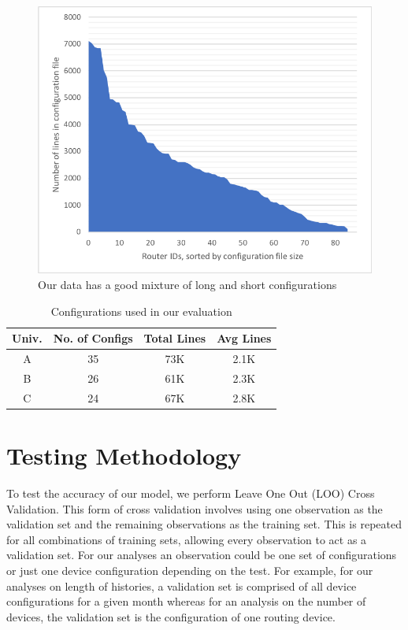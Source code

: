 \documentclass[../thesis.tex]{subfiles}
\begin{document}
\begin{figure}[H]
	\centering
	\includegraphics[width=5in]{config_sizes.png}
	\caption{Our data has a good mixture of long and short configurations}
	\label{fig:configs}
\end{figure}

\begin{table}
    \small \centering
    \begin{tabular}{ | c | c | c | c |}
    \hline
        \textbf{Univ.} & \textbf{No. of Configs} & \textbf{Total Lines} & \textbf{Avg Lines} \\ 
    \hline
    A & 35 & 73K & 2.1K \\ 
    B & 26 & 61K & 2.3K \\ 
    C & 24 & 67K & 2.8K \\ 
    \hline
    \end{tabular}
    \caption{Configurations used in our evaluation}
    \vspace{-1em}
    \label{tab:datasets}
\end{table}


\section{Testing Methodology}

To test the accuracy of our model, we perform Leave One Out (LOO) Cross Validation. This form of cross validation involves using one observation as the validation set and the remaining observations as the training set. This is repeated for all combinations of training sets, allowing every observation to act as a validation set. For our analyses an observation could be one set of configurations or just one device configuration depending on the test. For example, for our analyses on length of histories, a validation set is comprised of all device configurations for a given month whereas for an analysis on the number of devices, the validation set is the configuration of one routing device.\\
\end{document}
